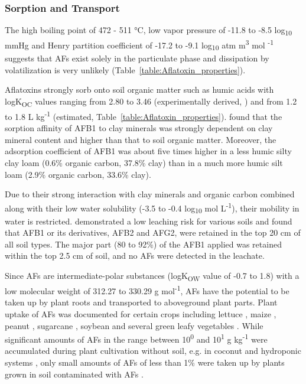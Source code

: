 \subsubsection*{Sorption and Transport} \label{subsubchap:sorption}

The high boiling point of 472 - 511 °C, low vapor pressure of -11.8 to -8.5 log\textsubscript{10} mmHg and Henry partition coefficient of -17.2 to -9.1 log\textsubscript{10} atm m\textsuperscript{3} mol \textsuperscript{-1} suggests that AFs exist solely in the particulate phase and dissipation by volatilization is very unlikely (Table~\ref{table:Aflatoxin_properties}). 


Aflatoxins strongly sorb onto soil organic matter such as humic acids \citep{van2006vitro} with logK\textsubscript{OC} values ranging from 2.80 to 3.46 (experimentally derived, \citet{schenzel2012experimentally}) and from 1.2 to 1.8 L kg\textsuperscript{-1} (estimated, Table~\ref{table:Aflatoxin_properties}). \citet{goldberg1985aflatoxin} found that the sorption affinity of AFB1 to clay minerals was strongly dependent on clay mineral content and higher than that to soil organic matter. Moreover, the adsorption coefficient of AFB1 was about five times higher in a less humic silty clay loam  (0.6\% organic carbon, 37.8\% clay) than in a much more humic silt loam (2.9\% organic carbon, 33.6\% clay).


Due to their strong interaction with clay minerals and organic carbon combined along with their low water solubility (-3.5 to -0.4 log\textsubscript{10} mol L\textsuperscript{-1}), their mobility in water is restricted. \citet{goldberg1985aflatoxin} demonstrated a low leaching risk for various soils and found that AFB1 or its derivatives, AFB2 and AFG2, were retained in the top 20 cm of all soil types. The major part (80 to 92\%) of the AFB1 applied was retained within the top 2.5 cm of soil, and no AFs were detected in the leachate.


Since AFs are intermediate-polar substances (logK\textsubscript{OW} value of -0.7 to 1.8) with a low molecular weight of 312.27 to 330.29 g mol\textsuperscript{-1}, AFs have the potential to be taken up by plant roots and transported to aboveground plant parts. Plant uptake of AFs was documented for certain crops including lettuce \citep{mertz1981absorption}, maize \citep{mertz1980uptake}, peanut \citep{snigdha2013mechanism, snigdha2015transport}, sugarcane \citep{hariprasad2015natural}, soybean \citep{jones1980toxic} and several green leafy vegetables \citep{hariprasad2013natural}. While significant amounts of AFs in the range between 10\textsuperscript{0} and 10\textsuperscript{1} \textmu g kg\textsuperscript{-1} were accumulated during plant cultivation without soil, e.g. in coconut and hydroponic systems \citep{snigdha2013mechanism, snigdha2015transport, hariprasad2013natural}, only small amounts of AFs of less than 1\% were taken up by plants grown in soil contaminated with AFs \citep{mertz1980uptake}. 

